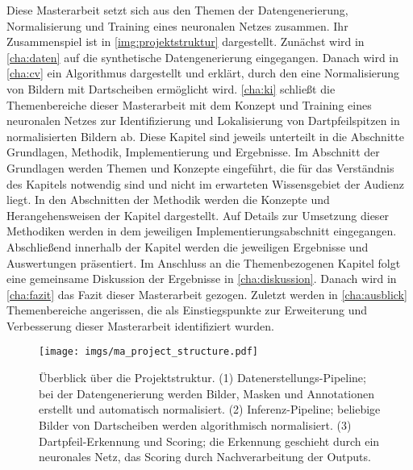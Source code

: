 Diese Masterarbeit setzt sich aus den Themen der Datengenerierung, Normalisierung und Training eines neuronalen Netzes zusammen. Ihr Zusammenspiel ist in \autoref{img:projektstruktur} dargestellt. Zunächst wird in \autoref{cha:daten} auf die synthetische Datengenerierung eingegangen. Danach wird in \autoref{cha:cv} ein Algorithmus dargestellt und erklärt, durch den eine Normalisierung von Bildern mit Dartscheiben ermöglicht wird. \autoref{cha:ki} schließt die Themenbereiche dieser Masterarbeit mit dem Konzept und Training eines neuronalen Netzes zur Identifizierung und Lokalisierung von Dartpfeilspitzen in normalisierten Bildern ab. Diese Kapitel sind jeweils unterteilt in die Abschnitte Grundlagen, Methodik, Implementierung und Ergebnisse. Im Abschnitt der Grundlagen werden Themen und Konzepte eingeführt, die für das Verständnis des Kapitels notwendig sind und nicht im erwarteten Wissensgebiet der Audienz liegt. In den Abschnitten der Methodik werden die Konzepte und Herangehensweisen der Kapitel dargestellt. Auf Details zur Umsetzung dieser Methodiken werden in dem jeweiligen Implementierungsabschnitt eingegangen. Abschließend innerhalb der Kapitel werden die jeweiligen Ergebnisse und Auswertungen präsentiert. Im Anschluss an die Themenbezogenen Kapitel folgt eine gemeinsame Diskussion der Ergebnisse in \autoref{cha:diskussion}. Danach wird in \autoref{cha:fazit} das Fazit dieser Masterarbeit gezogen. Zuletzt werden in \autoref{cha:ausblick} Themenbereiche angerissen, die als Einstiegspunkte zur Erweiterung und Verbesserung dieser Masterarbeit identifiziert wurden.

\begin{figure}
    \centering
    \texttt{[image: imgs/ma\_project\_structure.pdf]}
    \caption{Überblick über die Projektstruktur. (1) Datenerstellungs-Pipeline; bei der Datengenerierung werden Bilder, Masken und Annotationen erstellt und automatisch normalisiert. (2) Inferenz-Pipeline; beliebige Bilder von Dartscheiben werden algorithmisch normalisiert. (3) Dartpfeil-Erkennung und Scoring; die Erkennung geschieht durch ein neuronales Netz, das Scoring durch Nachverarbeitung der Outputs.}
    \label{img:projektstruktur}
\end{figure}



